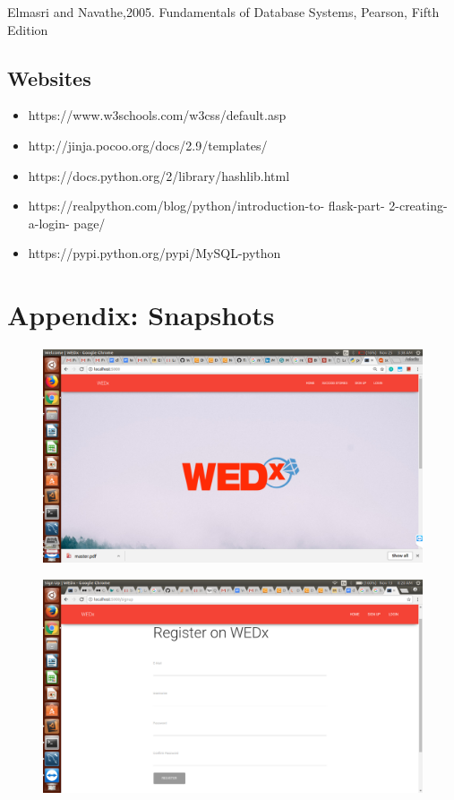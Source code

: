 \documentclass[12pt]{report}
\begin{document}
\noindent [3] Elmasri and Navathe,2005. Fundamentals of Database Systems, Pearson, Fifth Edition


\section{Websites}

\begin{itemize}
\item https://www.w3schools.com/w3css/default.asp
\item http://jinja.pocoo.org/docs/2.9/templates/
\item https://docs.python.org/2/library/hashlib.html
\item https://realpython.com/blog/python/introduction-to- flask-part- 2-creating- a-login-
page/
\item https://pypi.python.org/pypi/MySQL-python
\end{itemize}

\chapter{Appendix: Snapshots} 

\begin{figure}[!htb]
    \centering
    \includegraphics[width=1\textwidth]{sc-1.png}
\end{figure}

\begin{figure}[!htb]
    \centering
    \includegraphics[width=1\textwidth]{sc-2.png}
\end{figure}
\end{document}
